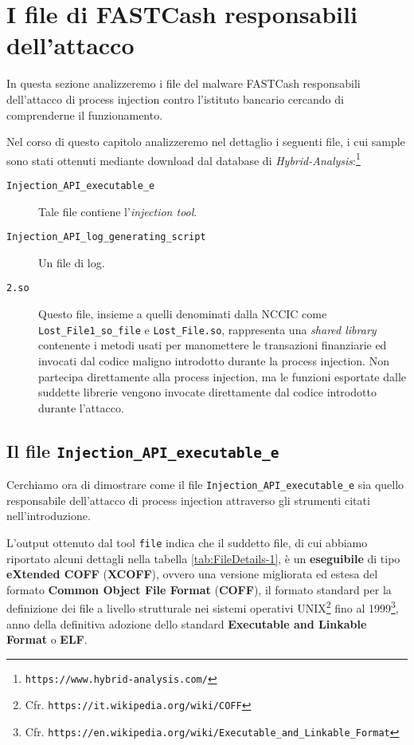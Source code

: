 \documentclass[10pt,a4paper, titlepage]{report}
\begin{document}
\newpage
\section{I file di FASTCash responsabili dell'attacco}

In questa sezione analizzeremo i file del malware FASTCash responsabili dell'attacco di process injection contro l'istituto bancario cercando di comprenderne il funzionamento. 

Nel corso di questo capitolo analizzeremo nel dettaglio i seguenti file, i cui sample sono stati ottenuti mediante download dal database di \textit{Hybrid-Analysis}:\footnote{\texttt{https://www.hybrid-analysis.com/}}

\begin{description}
\item[\texttt{Injection\_API\_executable\_e}] Tale file contiene l'\textit{injection tool}.
\item[\texttt{Injection\_API\_log\_generating\_script}] Un file di log.
\item[\texttt{2.so}] Questo file, insieme a quelli denominati dalla NCCIC come \texttt{Lost\_File1\_\-so\-\_file} e \texttt{Lost\_File.so}, rappresenta una \textit{shared library} contenente i metodi usati per manomettere le transazioni finanziarie ed invocati dal codice maligno introdotto durante la process injection. Non partecipa direttamente alla process injection, ma le funzioni esportate dalle suddette librerie vengono invocate direttamente dal codice introdotto durante l'attacco. 
\end{description}

\subsection{Il file \texttt{Injection\_API\_executable\_e}}\label{sec:InjectionAPIExecutableE}

Cerchiamo ora di dimostrare come il file \texttt{Injection\_API\_executable\_e} sia quello responsabile dell'attacco di process injection attraverso gli strumenti citati nell'introduzione.

L'output ottenuto dal tool \texttt{file} indica che il suddetto file, di cui abbiamo riportato alcuni dettagli nella tabella \ref{tab:FileDetails-1}, è un \textbf{eseguibile} di tipo \textbf{eXtended COFF} (\textbf{XCOFF}), ovvero una versione migliorata ed estesa del formato \textbf{Common Object File Format} (\textbf{COFF}), il formato standard per la definizione dei file a livello strutturale nei sistemi operativi UNIX\footnote{Cfr. \texttt{https://it.wikipedia.org/wiki/COFF}} fino al 1999\footnote{Cfr. \texttt{https://en.wikipedia.org/wiki/Executable\_and\_Linkable\_Format}}, anno della definitiva adozione dello standard \textbf{Executable and Linkable Format} o \textbf{ELF}.
\end{document}
